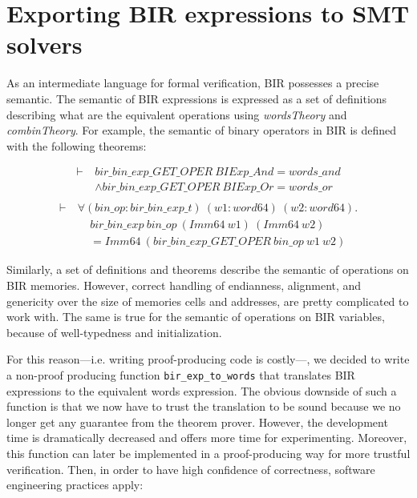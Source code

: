 \documentclass{kththesis}
\begin{document}
{\section{Exporting BIR expressions to SMT solvers} \label{exporting-bir-to-smt}

As an intermediate language for formal verification, \gls{BIR} possesses a precise semantic. The semantic of BIR expressions is expressed as a set of definitions describing what are the equivalent operations using \textit{wordsTheory} and \textit{combinTheory}. For example, the semantic of binary operators in BIR is defined with the following theorems\footnotemark:


\begin{small}
    \begin{equation}
        \begin{split}
            \vdash~&bir\_bin\_exp\_GET\_OPER~BIExp\_And = words\_and\\
                   &\land bir\_bin\_exp\_GET\_OPER~BIExp\_Or = words\_or\\
        \end{split}
        \label{bir_bin_exp_GET_OPER_def}
    \end{equation}
    \begin{equation}
        \begin{split}
            \vdash~&\forall (bin\_op :bir\_bin\_exp\_t)~(w1 :word64)~(w2 :word64).\\
                   &~~~~~bir\_bin\_exp~bin\_op~(Imm64~w1)~(Imm64~w2)\\
                   &~~~~~= Imm64~(bir\_bin\_exp\_GET\_OPER~bin\_op~w1~w2)
        \end{split}
        \label{bir_bin_exp_def}
    \end{equation}
\end{small}

Similarly, a set of definitions and theorems describe the semantic of operations on BIR memories. However, correct handling of endianness, alignment, and genericity over the size of memories cells and addresses, are pretty complicated to work with. The same is true for the semantic of operations on BIR variables, because of well-typedness and initialization.

For this reason---i.e. writing \gls{proof-producing} code is costly---, we decided to write a non-proof producing function \texttt{bir\_exp\_to\_words} that translates BIR expressions to the equivalent words expression. The obvious downside of such a function is that we now have to trust the translation to be sound because we no longer get any guarantee from the theorem prover. However, the development time is dramatically decreased and offers more time for experimenting. Moreover, this function can later be implemented in a proof-producing way for more trustful verification. Then, in order to have high confidence of correctness, software engineering practices apply:

}
\end{document}

